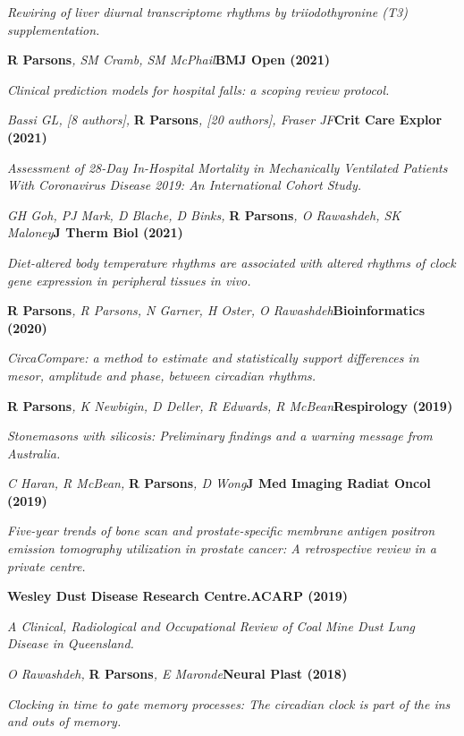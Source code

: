     \textit{Rewiring of liver diurnal transcriptome rhythms by triiodothyronine (T3) supplementation.}
\item
    \textbf{R Parsons}\textit{, SM Cramb, SM McPhail}\textbf{\hfill BMJ Open (2021)}\par 
    \textit{Clinical prediction models for hospital falls: a scoping review protocol.}
\item
    \textit{Bassi GL, [8 authors], }\textbf{R Parsons}\textit{, [20 authors], Fraser JF}\textbf{\hfill Crit Care Explor (2021)}\par 
    \textit{Assessment of 28-Day In-Hospital Mortality in Mechanically Ventilated Patients With Coronavirus Disease 2019: An International Cohort Study.}
\item
    \textit{GH Goh, PJ Mark, D Blache, D Binks, }\textbf{R Parsons}\textit{, O Rawashdeh, SK Maloney}\textbf{\hfill J Therm Biol (2021)}\par 
    \textit{Diet-altered body temperature rhythms are associated with altered rhythms of clock gene expression in peripheral tissues in vivo.}
\item
    \textbf{R Parsons}\textit{, R Parsons, N Garner, H Oster, O Rawashdeh}\textbf{\hfill Bioinformatics (2020)}\par 
    \textit{CircaCompare: a method to estimate and statistically support differences in mesor, amplitude and phase, between circadian rhythms.}
\item
    \textbf{R Parsons}\textit{, K Newbigin, D Deller, R Edwards, R McBean}\textbf{\hfill Respirology (2019)}\par 
    \textit{Stonemasons with silicosis: Preliminary findings and a warning message from Australia.}
\item
    \textit{C Haran, R McBean, }\textbf{R Parsons}\textit{, D Wong}\textbf{\hfill J Med Imaging Radiat Oncol (2019)}\par 
    \textit{Five-year trends of bone scan and prostate-specific membrane antigen positron emission tomography utilization in prostate cancer: A retrospective review in a private centre.}
\item
    \textbf{Wesley Dust Disease Research Centre.}\textbf{\hfill ACARP (2019)}\par 
    \textit{A Clinical, Radiological and Occupational Review of Coal Mine Dust Lung Disease in Queensland.}
\item
    \textit{O Rawashdeh, }\textbf{R Parsons}\textit{, E Maronde}\textbf{\hfill Neural Plast (2018)}\par 
    \textit{Clocking in time to gate memory processes: The circadian clock is part of the ins and outs of memory.}
